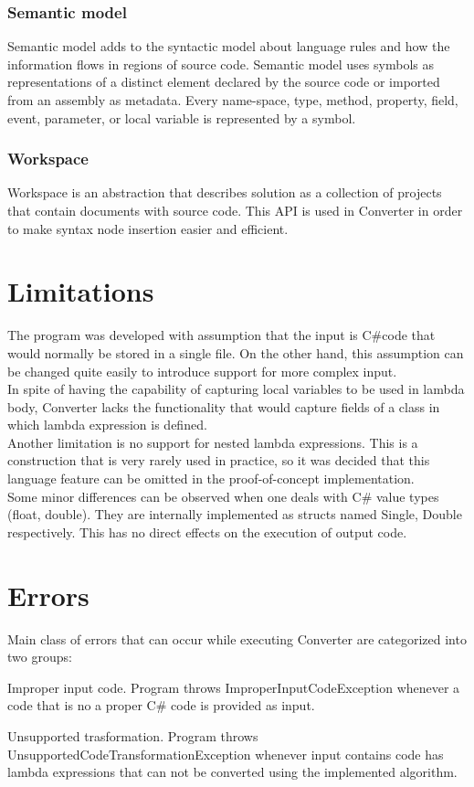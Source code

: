 \documentclass[]{report}
\begin{document}
    \subsubsection{Semantic model}
    Semantic model adds to the syntactic model about language rules and how the information flows in regions of source code. 
    Semantic model uses symbols as representations of a distinct element declared by the source code or imported from an assembly as metadata. Every name-space, type, method, property, field, event, parameter, or local variable is represented by a symbol\cite{roslynoverview}.
    
    \subsubsection{Workspace}
    Workspace is an abstraction that describes solution as a collection of projects that contain documents with source code. This API is used in Converter in order to make syntax node insertion easier and efficient.
    
    \section{Limitations}
        The program was developed with assumption that the input is C\#code that would normally be stored in a single file. On the other hand, this assumption can be changed  quite easily to introduce support for more complex input.
        \\
     In spite of having the capability of capturing local variables to be used in lambda body, Converter lacks the functionality that would capture fields of a class in which lambda expression is defined. 
     \\
     Another limitation is no support for nested lambda expressions. This is a construction that is very  rarely used in practice, so it was decided that this language feature can be omitted in the proof-of-concept implementation.
    \\
    Some minor differences can be observed when one deals with C\# value types (float, double). They are internally implemented as structs named Single, Double respectively. This has no direct effects on the execution of output code.
    \section{Errors}
    Main class of errors that can occur while executing Converter are categorized into two groups:
    \begin{list}
        \item Improper input code. Program throws ImproperInputCodeException whenever a code that is no a proper C\# code is provided as input.
        \item Unsupported trasformation. Program throws UnsupportedCodeTransformationException whenever input contains code has lambda expressions that can not be converted using the implemented algorithm. 
    \end{list}
\end{document}
